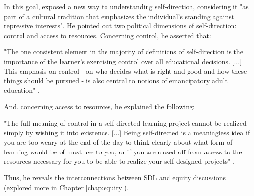 In this goal,  exposed a new way to understanding self-direction, considering it "as part of a cultural tradition that emphasizes the individual's standing against repressive interests". He pointed out two political dimensions of self-direction: control and access to resources. Concerning control, he asserted that:
\begin{citacao}
    "The one consistent element in the majority of definitions of self-direction is the importance of the learner's exercising control over all educational decisions. [...] This emphasis on control - on who decides what is right and good and how these things should be pursued - is also central to notions of emancipatory adult education" \cite[p.~233]{brookfield:1993}.
\end{citacao}
And, concerning access to resources, he explained the following:
\begin{citacao}
    "The full meaning of control in a self-directed learning project cannot be realized simply by wishing it into existence. [...] Being self-directed is a meaningless idea if you are too weary at the end of the day to think clearly about what form of learning would be of most use to you, or if you are closed off from access to the resources necessary for you to be able to realize your self-designed projects" \cite[p.~237]{brookfield:1993}.
\end{citacao}
Thus, he reveals the interconnections between \gls{SDL} and equity discussions (explored more in Chapter \ref{chap:equity}).

                

        

        

